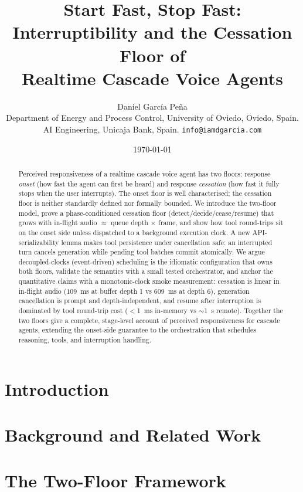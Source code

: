 \documentclass[11pt,a4paper]{article}
\title{Start Fast, Stop Fast: Interruptibility and the Cessation Floor of\\ Realtime Cascade Voice Agents}
\author{Daniel Garc\'ia Pe\~na\\
  \small Department of Energy and Process Control, University of Oviedo, Oviedo, Spain.\\
  \small AI Engineering, Unicaja Bank, Spain.
  \texttt{info@iamdgarcia.com}}
\date{\today}
\theoremstyle{definition}
\begin{document}
\maketitle

\begin{abstract}
Perceived responsiveness of a realtime cascade voice agent has two floors: response \emph{onset}
(how fast the agent can first be heard) and response \emph{cessation} (how fast it fully stops
when the user interrupts). The onset floor is well characterised; the cessation floor is neither
standardly defined nor formally bounded. We introduce the two-floor model, prove a
phase-conditioned cessation floor (detect/decide/cease/resume) that grows with in-flight audio
$\approx$ queue depth $\times$ frame, and show how tool round-trips sit on the onset side unless
dispatched to a background execution clock. A new API-serializability lemma makes tool persistence
under cancellation safe: an interrupted turn cancels generation while pending tool batches commit
atomically. We argue decoupled-clocks (event-driven) scheduling is the idiomatic configuration
that owns both floors, validate the semantics with a small tested orchestrator, and anchor the
quantitative claims with a monotonic-clock smoke measurement: cessation is linear in in-flight
audio ($109$~ms at buffer depth 1 vs $609$~ms at depth 6), generation cancellation is prompt
and depth-independent, and resume after interruption is dominated by tool round-trip cost
($<$1~ms in-memory vs $\sim$1~s remote).
Together the two floors give a complete, stage-level account of perceived responsiveness for
cascade agents, extending the onset-side guarantee to the orchestration that schedules
reasoning, tools, and interruption handling.
\end{abstract}

\section{Introduction}
\label{sec:introduction}


\section{Background and Related Work}
\label{sec:background}


\section{The Two-Floor Framework}
\label{sec:framework}

\end{document}
